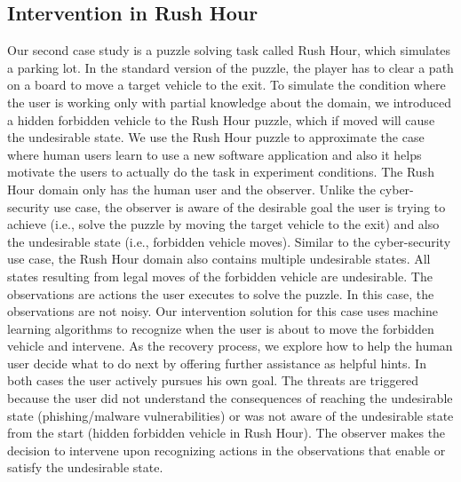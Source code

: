 \subsection{Intervention in Rush Hour}
Our second case study is a puzzle solving task called Rush Hour, which simulates a parking lot. In the standard version of the puzzle, the player has to clear a path on a board to move a target vehicle to the exit. To simulate the condition where the user is working only with partial knowledge about the domain, we introduced a hidden forbidden vehicle to the Rush Hour puzzle, which if moved will cause the undesirable state. 
We use the Rush Hour puzzle to approximate the case where human users learn to use a new software application and also it helps motivate the users to actually do the task in experiment conditions. 
The Rush Hour domain only has the human user and the observer. 
Unlike the cyber-security use case, the observer is aware of the desirable goal the user is trying to achieve (i.e., solve the puzzle by moving the target vehicle to the exit) and also the undesirable state (i.e., forbidden vehicle moves).
Similar to the cyber-security use case, the Rush Hour domain also contains multiple undesirable states. All states resulting from legal moves of the forbidden vehicle are undesirable.
The observations are actions the user executes to solve the puzzle. In this case, the observations are not noisy.
Our intervention solution for this case uses machine learning algorithms to recognize when the user is about to move the forbidden vehicle and intervene.
As the recovery process, we explore how to help the human user decide what to do next by offering further assistance as helpful hints.
In both cases the user actively pursues his own goal. 
The threats are triggered because the user did not understand the consequences of reaching the undesirable state (phishing/malware vulnerabilities) or was not aware of the undesirable state from the start (hidden forbidden vehicle in Rush Hour). 
The observer makes the decision to intervene upon recognizing actions in the observations that enable or satisfy the undesirable state.
 
